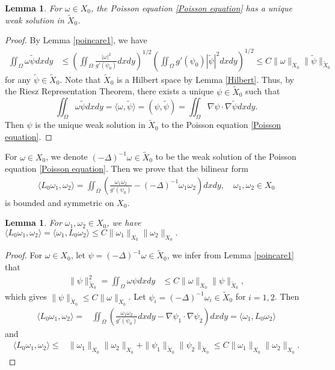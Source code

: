 \documentclass[1 [leqno, 11pt]{amsart}
\numberwithin{equation}{section}
\newtheorem{lemma}[Theorem]{Lemma}
\begin{document}
\begin{CJK*}{GBK}{song}
\begin{lemma}\label{1-1correspond}
For  $\omega \in X_0$, the Poisson equation
\eqref{Poisson equation}
has a unique weak solution in $\tilde{X}_0$.
\end{lemma}
\begin{proof}
By  Lemma \ref{poincare1},  we have
\begin{align*}
\iint_\Omega \omega \tilde {\psi} dxdy
& \leq \left( \iint_\Omega \frac{|\omega|^2}{g'(\psi_0)} dxdy  \right)^{1/2} \left( \iint_\Omega g'(\psi_0) |\tilde\psi|^2 dxdy  \right)^{1/2}  \leq C \|\omega\|_{X_0} \|\tilde{\psi}\|_{\tilde{X}_0}
\end{align*}
for any $\tilde{\psi}\in\tilde{X}_0$. Note that $\tilde{X}_0$ is a Hilbert space by Lemma \ref{Hilbert}. Thus,
by the Riesz Representation Theorem, there exists a unique $\psi \in \tilde{X}_0$ such that
$$\iint_\Omega \omega \tilde{\psi} dxdy = \langle \omega, \tilde{\psi} \rangle = (\psi, \tilde{\psi}) = \iint_\Omega \nabla \psi \cdot \nabla \tilde{\psi}dxdy.$$
Then $\psi $ is the unique weak solution in $\tilde X_0$ to the Poisson equation \eqref{Poisson equation}.
\end{proof}

For $\omega \in X_0$, we denote $(-\Delta)^{-1}\omega\in\tilde{X}_0$ to be the weak solution of the Poisson equation
\eqref{Poisson equation}.
Then we prove that the bilinear form
\begin{align}\label{L0-quadratic form}
 \langle L_0\omega_1,\omega_2\rangle=\iint_\Omega\left(\frac {\omega_1\omega_2} {g'(\psi_0)} - (-\Delta)^{-1}\omega_1\omega_2 \right) dxdy,\quad\omega_1,\omega_2\in X_0
\end{align}
 is bounded and symmetric  on $ X_0$.
\begin{lemma}\label{Lbounded}
For  $\omega_1,\omega_2 \in X_0$, we have
$\langle L_0 \omega_1, \omega_2 \rangle=\langle \omega_1, L_0 \omega_2 \rangle \leq C\|\omega_1\|_{X_0}\|\omega_2\|_{X_0}.$
\end{lemma}
\begin{proof}
For $\omega \in X_0$, let $\psi=(-\Delta)^{-1}\omega\in\tilde{X}_0$, we infer from  Lemma \ref{poincare1} that
\begin{align*}
\|\psi\|_{\tilde X_0}^2=\iint_\Omega \omega \psi dxdy
&   \leq C\|\omega\|_{X_0} \|\psi\|_{\tilde{X}_0},
\end{align*}
which gives $\|\psi\|_{\tilde X_0}\leq C \|\omega\|_{X_0}$. Let $\psi_i=(-\Delta)^{-1}\omega_i\in\tilde{X}_0$ for $i=1,2$. Then
\begin{align*}
\langle L_0 \omega_1, \omega_2 \rangle
 = &\iint_\Omega \left(\frac{\omega_1\omega_2}{g'(\psi_0)} dxdy -  \nabla\psi_1\cdot\nabla\psi_2\right) dxdy=
 \langle  \omega_1, L_0\omega_2 \rangle
\end{align*}
and
\begin{align*}
\langle L_0 \omega_1, \omega_2 \rangle
 \leq& \|\omega_1\|_{X_0}\|\omega_2\|_{X_0} + \|\psi_1\|_{\tilde{X}_0}\|\psi_2\|_{\tilde{X}_0}
 \leq C\|\omega_1\|_{X_0}\|\omega_2\|_{X_0}.
\end{align*}
\end{proof}


\end{CJK*}
\end{document}
